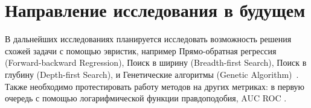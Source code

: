 \documentclass[preprint,12pt]{elsarticle}
\begin{document}
\section{Направление исследования в будущем}
В дальнейших исследованиях планируется исследовать возможность решения схожей задачи с помощью эвристик, например Прямо-обратная регрессия (Forward-backward Regression), Поиск в ширину (Breadth-first Search), Поиск в глубину (Depth-first Search), и Генетические алгоритмы (Genetic Algorithm)~\cite{vorontcov2007lectures}. Также необходимо протестировать работу методов на других метриках: в первую очередь с помощью логарифмической функции правдоподобия, AUC ROC \cite{montgomery2012introduction}. 






\end{document}
